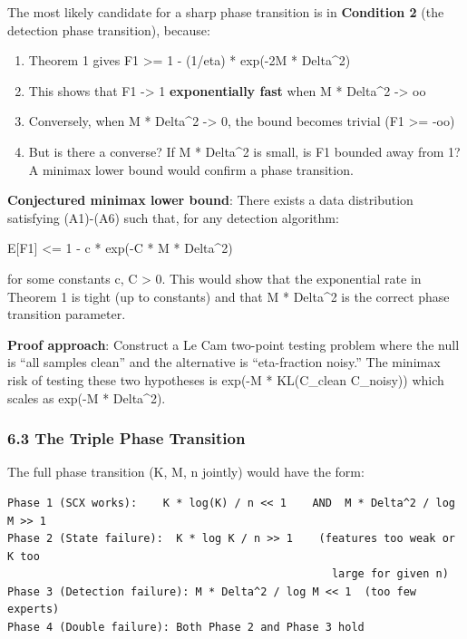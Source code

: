 \documentclass[
  12pt,
]{ctexart}
\providecommand{\tightlist}{%
  \setlength{\itemsep}{0pt}\setlength{\parskip}{0pt}}
\begin{document}
The most likely candidate for a sharp phase transition is in
\textbf{Condition 2} (the detection phase transition), because:

\begin{enumerate}
\def\labelenumi{\arabic{enumi}.}
\tightlist
\item
  Theorem 1 gives F1 \textgreater= 1 - (1/eta) * exp(-2M * Delta\^{}2)
\item
  This shows that F1 -\textgreater{} 1 \textbf{exponentially fast} when
  M * Delta\^{}2 -\textgreater{} oo
\item
  Conversely, when M * Delta\^{}2 -\textgreater{} 0, the bound becomes
  trivial (F1 \textgreater= -oo)
\item
  But is there a converse? If M * Delta\^{}2 is small, is F1 bounded
  away from 1? A minimax lower bound would confirm a phase transition.
\end{enumerate}

\textbf{Conjectured minimax lower bound}: There exists a data
distribution satisfying (A1)-(A6) such that, for any detection
algorithm:

E{[}F1{]} \textless= 1 - c * exp(-C * M * Delta\^{}2)

for some constants c, C \textgreater{} 0. This would show that the
exponential rate in Theorem 1 is tight (up to constants) and that M *
Delta\^{}2 is the correct phase transition parameter.

\textbf{Proof approach}: Construct a Le Cam two-point testing problem
where the null is ``all samples clean'' and the alternative is
``eta-fraction noisy.'' The minimax risk of testing these two hypotheses
is exp(-M * KL(C\_clean \textbar\textbar{} C\_noisy)) which scales as
exp(-M * Delta\^{}2).

\subsubsection{6.3 The Triple Phase
Transition}\label{the-triple-phase-transition}

The full phase transition (K, M, n jointly) would have the form:

\begin{verbatim}
Phase 1 (SCX works):    K * log(K) / n << 1    AND  M * Delta^2 / log M >> 1
Phase 2 (State failure):  K * log K / n >> 1    (features too weak or K too
                                                  large for given n)
Phase 3 (Detection failure): M * Delta^2 / log M << 1  (too few experts)
Phase 4 (Double failure): Both Phase 2 and Phase 3 hold
\end{verbatim}
\end{document}
